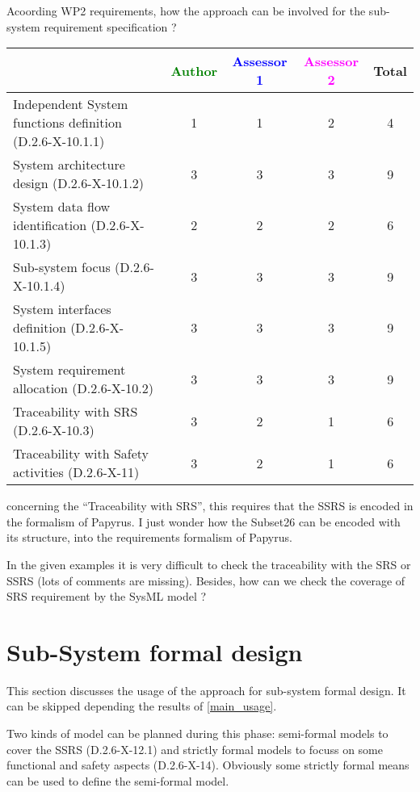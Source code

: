 Acoording WP2 requirements, how the approach can be involved for the sub-system requirement specification ?

\begin{tabular}{|l | c | c | c | c|}
\hline
& \textcolor{green}{Author} & \textcolor{blue}{Assessor 1} & \textcolor{magenta}{Assessor 2} & Total \\
\hline
Independent System functions definition (D.2.6-X-10.1.1) & 1 & 1 & 2 & 4 \\
\hline
System architecture design (D.2.6-X-10.1.2) & 3 & 3 & 3  & 9 \\
\hline
System data flow identification (D.2.6-X-10.1.3) & 2 & 2 & 2 & 6 \\
\hline
Sub-system focus (D.2.6-X-10.1.4) & 3 & 3 & 3 & 9 \\
\hline
System interfaces definition (D.2.6-X-10.1.5) & 3 & 3 & 3 &  9\\
\hline
System requirement allocation (D.2.6-X-10.2) & 3 & 3 & 3 & 9 \\
\hline
Traceability with SRS (D.2.6-X-10.3) & 3 & 2 & 1 & 6 \\
\hline
Traceability with Safety activities (D.2.6-X-11) & 3 & 2 & 1 & 6 \\
\hline
\end{tabular}

\begin{assessor1}
concerning the "`Traceability with SRS"', this requires that the SSRS is encoded in the formalism of Papyrus. I just wonder how the Subset26 can be encoded with its structure, into the requirements formalism of Papyrus. 
\end{assessor1}


\begin{assessor2}
In the given examples it is very difficult to check the traceability with the SRS or SSRS (lots of comments are missing). Besides, how can we check the coverage of SRS requirement by the SysML model ?
\end{assessor2}



\section{Sub-System formal design}
This section discusses the usage of the approach for sub-system formal design.
It can be skipped depending the results of \ref{main_usage}.

Two kinds of model can be planned during this phase: semi-formal models to cover the SSRS (D.2.6-X-12.1) and strictly formal models to focuss on some functional and safety aspects (D.2.6-X-14). Obviously some strictly formal means can be used to define the semi-formal model.

